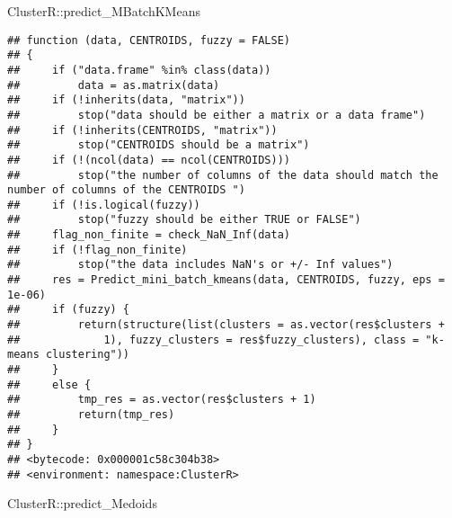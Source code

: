 \documentclass[
]{article}
\newenvironment{Shaded}{\begin{snugshade}}{\end{snugshade}}
\newcommand{\NormalTok}[1]{#1}
\newcommand{\SpecialCharTok}[1]{\textcolor[rgb]{0.00,0.00,0.00}{#1}}
\begin{document}
\begin{Shaded}
\begin{Highlighting}[]
\NormalTok{ClusterR}\SpecialCharTok{::}\NormalTok{predict\_MBatchKMeans}
\end{Highlighting}
\end{Shaded}

\begin{verbatim}
## function (data, CENTROIDS, fuzzy = FALSE) 
## {
##     if ("data.frame" %in% class(data)) 
##         data = as.matrix(data)
##     if (!inherits(data, "matrix")) 
##         stop("data should be either a matrix or a data frame")
##     if (!inherits(CENTROIDS, "matrix")) 
##         stop("CENTROIDS should be a matrix")
##     if (!(ncol(data) == ncol(CENTROIDS))) 
##         stop("the number of columns of the data should match the number of columns of the CENTROIDS ")
##     if (!is.logical(fuzzy)) 
##         stop("fuzzy should be either TRUE or FALSE")
##     flag_non_finite = check_NaN_Inf(data)
##     if (!flag_non_finite) 
##         stop("the data includes NaN's or +/- Inf values")
##     res = Predict_mini_batch_kmeans(data, CENTROIDS, fuzzy, eps = 1e-06)
##     if (fuzzy) {
##         return(structure(list(clusters = as.vector(res$clusters + 
##             1), fuzzy_clusters = res$fuzzy_clusters), class = "k-means clustering"))
##     }
##     else {
##         tmp_res = as.vector(res$clusters + 1)
##         return(tmp_res)
##     }
## }
## <bytecode: 0x000001c58c304b38>
## <environment: namespace:ClusterR>
\end{verbatim}

\begin{Shaded}
\begin{Highlighting}[]
\NormalTok{ClusterR}\SpecialCharTok{::}\NormalTok{predict\_Medoids}
\end{Highlighting}
\end{Shaded}
\end{document}
